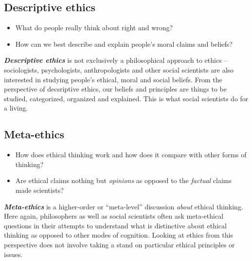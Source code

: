\documentclass[12pt, openany]{book}
\makeatletter
\providecommand{\tightlist}{%
  \setlength{\itemsep}{0pt}\setlength{\parskip}{0pt}}
\newenvironment{kframe}{%
\medskip{}
\setlength{\fboxsep}{.8em}
 \def\at@end@of@kframe{}%
 \ifinner\ifhmode%
  \def\at@end@of@kframe{\end{minipage}}%
  \begin{minipage}{\columnwidth}%
 \fi\fi%
 \def\FrameCommand##1{\hskip\@totalleftmargin \hskip-\fboxsep
 \colorbox{shadecolor}{##1}\hskip-\fboxsep
     \hskip-\linewidth \hskip-\@totalleftmargin \hskip\columnwidth}%
 \MakeFramed {\advance\hsize-\width
   \@totalleftmargin\z@ \linewidth\hsize
   \@setminipage}}%
 {\par\unskip\endMakeFramed%
 \at@end@of@kframe}
\newenvironment{rmdblock}[1]
  {
  \begin{itemize}
  \renewcommand{\labelitemi}{
    \raisebox{-.7\height}[0pt][0pt]{
      {\setkeys{Gin}{width=3em,keepaspectratio}\texttt{[image: img/\#1]}}
    }
  }
  \setlength{\fboxsep}{1em}
  \begin{kframe}
  \item
  }
  {
  \end{kframe}
  \end{itemize}
  }
\newenvironment{question}
  {\begin{rmdblock}{question}}
  {\end{rmdblock}}
\makeatother
\begin{document}
\hypertarget{descriptive-ethics}{%
\subsection*{Descriptive ethics}\label{descriptive-ethics}}


\begin{question}

\begin{itemize}
\tightlist
\item
  What do people really think about right and wrong?
\item
  How can we best describe and explain people's moral claims and beliefs?
\end{itemize}

\end{question}

\textbf{\emph{Descriptive ethics}} is not exclusively a philosophical approach to ethics -- sociologists, psychologists, anthropologists and other social scientists are also interested in studying people's ethical, moral and social beliefs. From the perspective of decsriptive ethics, our beliefs and principles are things to be studied, categorized, organized and explained. This is what social scientists do for a living.

\hypertarget{meta-ethics}{%
\subsection*{Meta-ethics}\label{meta-ethics}}


\begin{question}

\begin{itemize}
\tightlist
\item
  How does ethical thinking work and how does it compare with other forms of thinking?
\item
  Are ethical claims nothing but \emph{opinions} as opposed to the \emph{factual} claims made scientists?
\end{itemize}

\end{question}

\textbf{\emph{Meta-ethics}} is a higher-order or ``meta-level'' discussion \emph{about} ethical thinking. Here again, philosophers as well as social scientists often ask meta-ethical questions in their attempts to understand what is distinctive about ethical thinking as opposed to other modes of cognition. Looking at ethics from this perspective does not involve taking a stand on particular ethical principles or issues.
\end{document}
